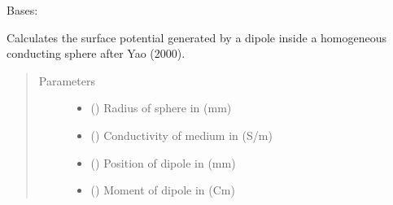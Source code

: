\documentclass[letterpaper,10pt,english,openany,oneside]{sphinxmanual}
\begin{document}
\begin{fulllineitems}
\label{\detokenize{pygpc.testfunctions:pygpc.testfunctions.testfunctions.PotentialHomogeneousDipole}}
Bases: {\hyperref[\detokenize{pygpc:pygpc.AbstractModel.AbstractModel}]{}}

Calculates the surface potential generated by a dipole inside a homogeneous conducting sphere after Yao (2000).
\begin{quote}\begin{description}
\item[{Parameters}] \leavevmode\begin{itemize}
\item {} 
\sphinxstyleliteralstrong{\sphinxupquote{{[}}}\sphinxstyleliteralstrong{\sphinxupquote{{]}}} () \textendash{} Radius of sphere in (mm)

\item {} 
\sphinxstyleliteralstrong{\sphinxupquote{{[}}}\sphinxstyleliteralstrong{\sphinxupquote{{]}}} () \textendash{} Conductivity of medium in (S/m)

\item {} 
\sphinxstyleliteralstrong{\sphinxupquote{{[}}}\sphinxstyleliteralstrong{\sphinxupquote{{]}}} (\sphinxstyleliteralemphasis{\sphinxupquote{ {[}}}\sphinxstyleliteralemphasis{\sphinxupquote{{]}}}) \textendash{} Position of dipole in (mm)

\item {} 
\sphinxstyleliteralstrong{\sphinxupquote{{[}}}\sphinxstyleliteralstrong{\sphinxupquote{{]}}} (\sphinxstyleliteralemphasis{\sphinxupquote{ {[}}}\sphinxstyleliteralemphasis{\sphinxupquote{{]}}}) \textendash{} Moment of dipole in (Cm)


\end{itemize}
\end{description}
\end{quote}
\end{fulllineitems}
\end{document}
